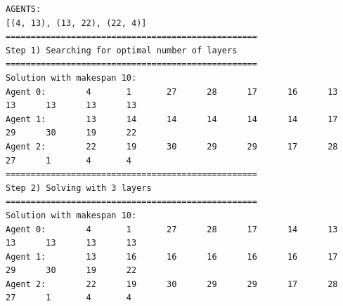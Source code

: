 \documentclass[12pt, a4paper, hidelinks]{article}
\numberwithin{equation}{section}
\begin{document}
\begin{lstlisting}[label={lst:warehouse}]
AGENTS:
[(4, 13), (13, 22), (22, 4)]
==================================================
Step 1) Searching for optimal number of layers
==================================================
Solution with makespan 10:
Agent 0:        4       1       27      28      17      16      13      13      13      13      13
Agent 1:        13      14      14      14      14      14      17      29      30      19      22
Agent 2:        22      19      30      29      29      17      28      27      1       4       4
==================================================
Step 2) Solving with 3 layers
==================================================
Solution with makespan 10:
Agent 0:        4       1       27      28      17      14      13      13      13      13      13
Agent 1:        13      16      16      16      16      16      17      29      30      19      22
Agent 2:        22      19      30      29      29      17      28      27      1       4       4
\end{lstlisting}
\end{document}
